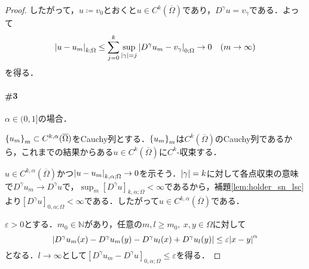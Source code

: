 \documentclass[a4paper]{ltjsarticle}
\newcommand{\Nset}{\mathbb{N}}
\newcommand{\Om}{\Omega}
\newcommand{\Ombar}{\overline{\Omega}}
\newcommand{\1}{\mathbbm{1}}
\numberwithin{equation}{section}
\theoremstyle{definition}
\begin{document}
\begin{proof}
    したがって，$u\coloneqq v_0$とおくと$u\in C^k(\Ombar)$であり，$D^\gamma u=v_\gamma$である．よって
    \begin{equation}
        \abs{u-u_m}_{k;\Om}\leq \sum_{j=0}^k\sup_{\abs{\gamma}=j}\abs{D^\gamma u_m-v_\gamma}_{0;\Om}\to0\quad (m\to\infty)
    \end{equation}
    を得る．

    \paragraph*{\#3}$\alpha\in (0,1]$の場合．

    $\qty{u_m}_m\subset C^{k,\alpha}(\Ombar)$をCauchy列とする．$\qty{u_m}_m$は$C^k(\Ombar)$のCauchy列であるから，これまでの結果からある$u\in C^k(\Ombar)$に$C^k$-収束する．

    $u\in C^{k,\alpha}(\Ombar)$かつ$\abs{u-u_m}_{k,\alpha;\Om}\to0$を示そう．$\abs{\gamma}=k$に対して各点収束の意味で$D^\gamma u_m\to D^\gamma u$で，$\sup_{m}[D^\gamma u]_{k,\alpha;\Om}<\infty$であるから，補題\ref{lem:holder_sn_lsc}より$[D^\gamma u]_{0,\alpha;\Om}<\infty$である．したがって$u\in C^{k,\alpha}(\Ombar)$である．

    $\varepsilon>0$とする．$m_0\in\Nset$があり，任意の$m,l\geq m_0,\ x,y\in\Om$に対して
    \begin{equation}
        \abs{D^\gamma u_m(x)-D^\gamma u_m(y)-D^\gamma u_l(x)+D^\gamma u_l(y)}\leq \varepsilon\abs{x-y}^\alpha 
    \end{equation}
    となる．$l\to\infty$として$[D^\gamma u_m-D^\gamma u]_{0,\alpha;\Om}\leq \varepsilon$を得る．
\end{proof}
\end{document}
